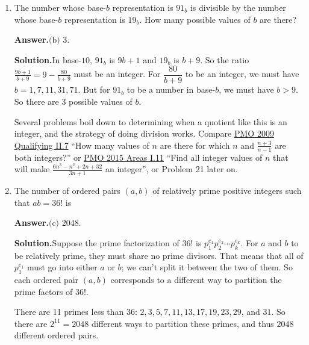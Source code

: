 \documentclass[11pt,paper=letter]{scrartcl}
\newcommand{\ans}{{\sffamily \bfseries Answer.}\;}
\newcommand{\sol}{{\sffamily \bfseries Solution.}\;}
\newcommand{\rem}[1]{{\small \sffamily \sansmath {\bfseries Remark.} #1}}
\begin{document}
\begin{enumerate}[align=left,leftmargin=*]

\ans $\boxed{\text{(c) }960}$.

\sol We use complimentary counting. The total number of subsets is $2^{10} = 1024$. We now count the number of subsets which don't contain any semiprime. The semiprimes are $4, 6, 10$, and $14$, so there are $6$ remaining elements, which form $2^{6} = 64$ subsets. Subtracting these gives $1024 - 64 = 960$.

\item The number whose base-$b$ representation is $91_b$ is divisible by the number whose base-$b$ representation is $19_b$. How many possible values of $b$ are there?


\ans $\boxed{\text{(b) }3}$.

\sol In base-$10$, $91_b$ is $9b + 1$ and $19_b$ is $b + 9$. So the ratio
$\displaystyle
  \frac{9b + 1}{b + 9} = 9 - \frac{80}{b + 9}
$
must be an integer. For $\dfrac{80}{b + 9}$ to be an integer, we must have $b = 1, 7, 11, 31, 71$. But for $91_b$ to be a number in base-$b$, we must have $b > 9$. So there are $3$ possible values of $b$.

\rem{Several problems boil down to determining when a quotient like this is an integer, and the strategy of doing division works. Compare \href{https://cjquines.com/files/pmo2009.pdf}{PMO 2009 Qualifying II.7} ``How many values of $n$ are there for which $n$ and $\frac{n+3}{n-1}$ are both integers?'' or \href{http://pmo.ph/wp-content/uploads/2015/09/PMO17_area.pdf}{PMO 2015 Areas I.11} ``Find all integer values of $n$ that will make $\frac{6n^3 - n^2 +2n + 32}{3n + 1}$ an integer'', or Problem 21 later on.}

\item The number of ordered pairs $(a, b)$ of relatively prime positive integers such that $ab = 36!$ is


\ans $\boxed{\text{(c) }2048}$.

\sol Suppose the prime factorization of $36!$ is $p_1^{e_1}p_2^{e_2}\cdots p_k^{e_k}$. For $a$ and $b$ to be relatively prime, they must share no prime divisors. That means that all of $p_1^{e_1}$ must go into either $a$ or $b$; we can't split it between the two of them. So each ordered pair $(a, b)$ corresponds to a different way to partition the prime factors of $36!$.

There are 11 primes less than $36$: $2, 3, 5, 7, 11, 13, 17, 19, 23, 29$, and $31$. So there are $2^{11} = 2048$ different ways to partition these primes, and thus $2048$ different ordered pairs.

\end{enumerate}
\end{document}
